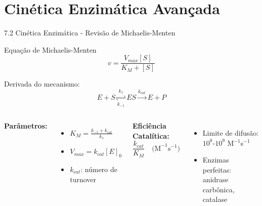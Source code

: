 \section{Cinética Enzimática Avançada}

\begin{frame}[shrink=5]{7.2 Cinética Enzimática - Revisão de Michaelis-Menten}
\begin{block}{Equação de Michaelis-Menten}
\begin{equation*}
v = \frac{V_{max}[S]}{K_M + [S]}
\end{equation*}

Derivada do mecanismo:
\begin{equation*}
E + S \underset{k_{-1}}{\overset{k_1}{\rightleftharpoons}} ES \overset{k_{cat}}{\longrightarrow} E + P
\end{equation*}
\end{block}

\vspace{0.3cm}

\begin{columns}
\textbf{Parâmetros:}
\begin{itemize}
    \item $K_M = \frac{k_{-1} + k_{cat}}{k_1}$
    \item $V_{max} = k_{cat}[E]_0$
    \item $k_{cat}$: número de turnover
\end{itemize}

\textbf{Eficiência Catalítica:}
\begin{equation*}
\frac{k_{cat}}{K_M} \quad \text{(M}^{-1}\text{s}^{-1}\text{)}
\end{equation*}

\begin{itemize}
    \item Limite de difusão: $10^8$-$10^9$ M$^{-1}$s$^{-1}$
    \item Enzimas perfeitas: anidrase carbônica, catalase
\end{itemize}
\end{columns}
\end{frame}

